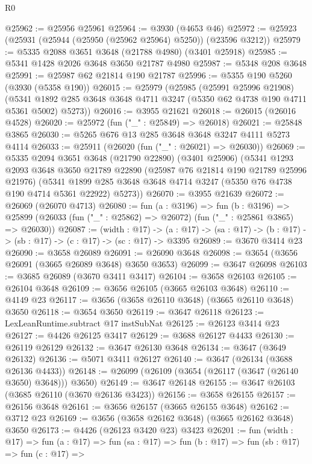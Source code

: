 \begin{lexlean}{R0}
\begin{coremodule}
@25962 := @25956 @25961
@25964 := @3930 (@4653 @46)
@25972 := @25923 (@25931 (@25944 (@25950 (@25962 @25964) @5250)) (@23596 @3212))
@25979 := @5335 @2088 @3651 @3648 (@21788 @4980) (@3401 @25918)
@25985 := @5341 @1428 @2026 @3648 @3650 @21787 @4980
@25987 := @5348 @208 @3648
@25991 := @25987 @62 @21814 @190 @21787
@25996 := @5355 @190 @5260 (@3930 (@5358 @190))
@26015 := @25979
    (@25985
      (@25991 @25996 @21908)
      (@5341 @1892 @285 @3648 @3648 @4711 @3247 (@5350 @62 @4738 @190 @4711 @5361 @5002) @5273))
@26016 := @3955 @21621
@26018 := @26015 (@26016 @4528)
@26020 := @25972 (fun ("_" : @25849) => @26018)
@26021 := @25848 @3865
@26030 := @5265 @676 @13 @285 @3648 @3648 @3247 @4111 @5273 @4114
@26033 := @25911 (@26020 (fun ("_" : @26021) => @26030))
@26069 := @5335
    @2094
    @3651
    @3648
    (@21790 @22890)
    (@3401 @25906)
    (@5341
      @1293
      @2093
      @3648
      @3650
      @21789
      @22890
      (@25987 @76 @21814 @190 @21789 @25996 @21976)
      (@5341 @1899 @285 @3648 @3648 @4714 @3247 (@5350 @76 @4738 @190 @4714 @5361 @22922) @5273))
@26070 := @3955 @21639
@26072 := @26069 (@26070 @4713)
@26080 := fun (a : @3196) =>
  fun (b : @3196) =>
  @25899 (@26033 (fun ("_" : @25862) => @26072) (fun ("_" : @25861 @3865) => @26030))
@26087 := (width : @17) ->
  (a : @17) -> (sa : @17) -> (b : @17) -> (sb : @17) -> (c : @17) -> (sc : @17) -> @3395
@26089 := @3670 @3414 @23
@26090 := @3658 @26089
@26091 := @26090 @3648
@26098 := @3654 (@3656 @26091 (@3665 @26089 @3648) @3650 @3653)
@26099 := @3647 @26098
@26103 := @3685 @26089 (@3670 @3411 @3417)
@26104 := @3658 @26103
@26105 := @26104 @3648
@26109 := @3656 @26105 (@3665 @26103 @3648)
@26110 := @4149 @23
@26117 := @3656 (@3658 @26110 @3648) (@3665 @26110 @3648) @3650
@26118 := @3654 @3650
@26119 := @3647 @26118
@26123 := LexLeanRuntime.subtract @17 instSubNat
@26125 := @26123 @3414 @23
@26127 := @4426 @26125 @3417
@26129 := @3688 @26127 @4433
@26130 := @26119 @26129
@26132 := @3647 @26130 @3648
@26134 := @3647 (@3649 @26132)
@26136 := @5071 @3411 @26127
@26140 := @3647 (@26134 (@3688 @26136 @4433))
@26148 := @26099 (@26109 (@3654 (@26117 (@3647 (@26140 @3650) @3648))) @3650)
@26149 := @3647 @26148
@26155 := @3647 @26103 (@3685 @26110 (@3670 @26136 @3423))
@26156 := @3658 @26155
@26157 := @26156 @3648
@26161 := @3656 @26157 (@3665 @26155 @3648)
@26162 := @3712 @23
@26169 := @3656 (@3658 @26162 @3648) (@3665 @26162 @3648) @3650
@26173 := @4426 (@26123 @3420 @23) @3423
@26201 := fun (width : @17) =>
  fun (a : @17) =>
  fun (sa : @17) =>
  fun (b : @17) =>
  fun (sb : @17) =>
  fun (c : @17) =>

\end{coremodule}
\end{lexlean}

